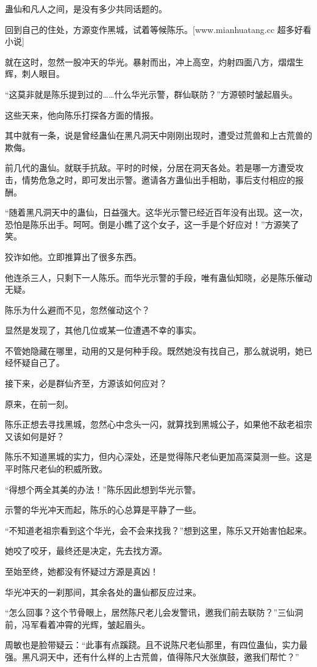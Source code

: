 \begin{this_body}
蛊仙和凡人之间，是没有多少共同话题的。

回到自己的住处，方源变作黑城，试着等候陈乐。[www.mianhuatang.cc 超多好看小说]

就在这时，忽然一股冲天的华光。暴射而出，冲上高空，灼射四面八方，熠熠生辉，刺人眼目。

“这莫非就是陈乐提到过的……什么华光示警，群仙联防？”方源顿时皱起眉头。

这些天来，他向陈乐打探各方面的情报。

其中就有一条，说是曾经蛊仙在黑凡洞天中刚刚出现时，遭受过荒兽和上古荒兽的欺侮。

前几代的蛊仙。就联手抗敌。平时的时候，分居在洞天各处。若是哪一方遭受攻击，情势危急之时，即可发出示警。邀请各方蛊仙出手相助，事后支付相应的报酬。

“随着黑凡洞天中的蛊仙，日益强大。这华光示警已经近百年没有出现。这一次，恐怕是陈乐出手。呵呵。倒是小瞧了这个女子，这一手是个好应对！”方源笑了笑。

狡诈如他。立即推算出了很多东西。

他连杀三人，只剩下一人陈乐。而华光示警的手段，唯有蛊仙知晓，必是陈乐催动无疑。

陈乐为什么避而不见，忽然催动这个？

显然是发现了，其他几位或某一位遭遇不幸的事实。

不管她隐藏在哪里，动用的又是何种手段。既然她没有找自己，那么就说明，她已经怀疑自己了。

接下来，必是群仙齐至，方源该如何应对？

原来，在前一刻。

陈乐正想去寻找黑城，忽然心中念头一闪，就算找到黑城公子，如果他不敌老祖宗又该如何是好？

陈乐不知道黑城的实力，但内心深处，还是觉得陈尺老仙更加高深莫测一些。这是平时陈尺老仙的积威所致。

“得想个两全其美的办法！”陈乐因此想到华光示警。

示警的华光冲天而起，陈乐的心总算是平静了一些。

“不知道老祖宗看到这个华光，会不会来找我？”想到这里，陈乐又开始害怕起来。

她咬了咬牙，最终还是决定，先去找方源。

至始至终，她都没有怀疑过方源是真凶！

华光冲天的一刹那间，其余各处的蛊仙都反应过来。

“怎么回事？这个节骨眼上，居然陈尺老儿会发警讯，邀我们前去联防？”三仙洞前，冯军看着冲霄的光辉，皱起眉头。

周敏也是脸带疑云：“此事有点蹊跷。且不说陈尺老仙那里，有四位蛊仙，实力最强。黑凡洞天中，还有什么样的上古荒兽，值得陈尺大张旗鼓，邀我们帮忙？”


\end{this_body}
